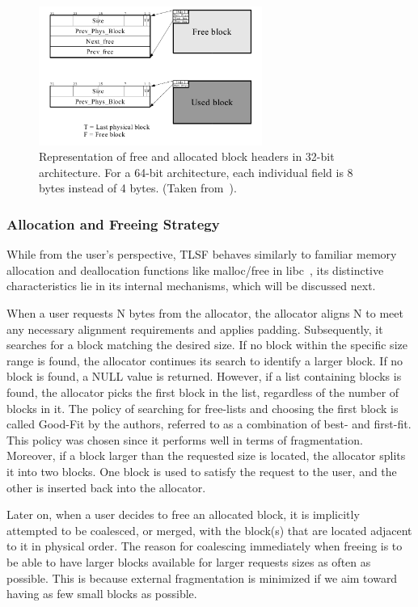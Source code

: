 
\begin{figure}[H]
    \centering
    \includegraphics[width=0.65\textwidth]{figures/blockheader_reference.png}
    \caption{Representation of free and allocated block headers in 32-bit architecture. For a 64-bit architecture, each individual field is 8 bytes instead of 4 bytes. (Taken from~\cite{TLSF}).}
    \label{fig:blockheader_reference}
\end{figure}

\subsubsection{Allocation and Freeing Strategy}

While from the user's perspective, TLSF behaves similarly to familiar memory allocation and deallocation functions like malloc/free in libc~\cite{libc_malloc_free}, its distinctive characteristics lie in its internal mechanisms, which will be discussed next.

When a user requests N bytes from the allocator, the allocator aligns N to meet any necessary alignment requirements and applies padding. Subsequently, it searches for a block matching the desired size. If no block within the specific size range is found, the allocator continues its search to identify a larger block. If no block is found, a NULL value is returned. However, if a list containing blocks is found, the allocator picks the first block in the list, regardless of the number of blocks in it. The policy of searching for free-lists and choosing the first block is called Good-Fit by the authors, referred to as a combination of best- and first-fit. This policy was chosen since it performs well in terms of fragmentation. Moreover, if a block larger than the requested size is located, the allocator splits it into two blocks. One block is used to satisfy the request to the user, and the other is inserted back into the allocator.

Later on, when a user decides to free an allocated block, it is implicitly attempted to be coalesced, or merged, with the block(s) that are located adjacent to it in physical order. The reason for coalescing immediately when freeing is to be able to have larger blocks available for larger requests sizes as often as possible. This is because external fragmentation is minimized if we aim toward having as few small blocks as possible.

